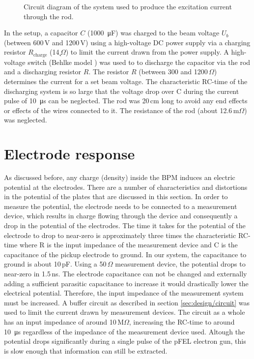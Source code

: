 \begin{figure}[h]
\centering

\caption{Circuit diagram of the system used to produce the excitation current through the rod.}
\label{fig:circuitsetup}
\end{figure}

In the setup, a capacitor $C$ (\SI{1000}{\micro\farad}) was charged to the beam voltage $U_b$ (between 600\,V and 1200\,V) using a high-voltage DC power supply via a charging resistor $R_\text{charge}$ (14\,\k$\Omega$) to limit the current drawn from the power supply.
A high-voltage switch (Behlke model ) was used to to discharge the capacitor via the rod and a discharging resistor $R$. The resistor $R$ (between 300 and 1200\,$\Omega$) determines the current for a set beam voltage.
The characteristic RC-time of the discharging system is so large that the voltage drop over C during the current pulse of \SI{10}{\micro\second} can be neglected.
The rod was 20\,cm long to avoid any end effects or effects of the wires connected to it. The resistance of the rod (about 12.6\,m$\Omega$) was neglected.

%
\section{Electrode response}
\label{sec:calibration/signal}
As discussed before, any charge (density) inside the BPM induces an electric potential at the electrodes. There are a number of characteristics and distortions in the potential of the plates that are discussed in this section.
In order to measure the potential, the electrode needs to be connected to a measurement device, which results in charge flowing through the device and consequently a drop in the potential of the electrodes.
The time it takes for the potential of the electrode to drop to near-zero is approximately three times the characteristic RC-time where R is the input impedance of the measurement device and C is the capacitance of the pickup electrode to ground. In our system, the capacitance to ground is about 10\,pF. Using a 50\,$\Omega$ measurement device, the potential drops to near-zero in 1.5\,ns.
The electrode capacitance can not be changed and externally adding a sufficient parasitic capacitance to increase it would drastically lower the electrical potential. Therefore, the input impedance of the measurement system must be increased.
A buffer circuit as described in section \ref{sec:design/circuit} was used to limit the current drawn by measurement devices. The circuit as a whole has an input impedance of around 10\,M$\Omega$, increasing the RC-time to around \SI{10}{\micro\second} regardless of the impedance of the measurement device used.
Altough the potential drops significantly during a single pulse of the pFEL electron gun, this is slow enough that information can still be extracted.

